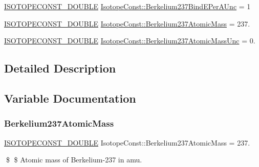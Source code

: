 \begin{DoxyCompactItemize}
\mbox{\hyperlink{group___isotope_const-_macros_ga8f45a7272ce02c0b4c65c44636ed719a}{I\+S\+O\+T\+O\+P\+E\+C\+O\+N\+S\+T\+\_\+\+D\+O\+U\+B\+LE}} \mbox{\hyperlink{group___isotope_const-_berkelium-_bk237_ga5ef39222d4a4b0b581ccd624ea06e32a}{Isotope\+Const\+::\+Berkelium237\+Bind\+E\+Per\+A\+Unc}} = 1
\item 
\mbox{\hyperlink{group___isotope_const-_macros_ga8f45a7272ce02c0b4c65c44636ed719a}{I\+S\+O\+T\+O\+P\+E\+C\+O\+N\+S\+T\+\_\+\+D\+O\+U\+B\+LE}} \mbox{\hyperlink{group___isotope_const-_berkelium-_bk237_gabf83e240309f0aab4899fb7a36ca5ffe}{Isotope\+Const\+::\+Berkelium237\+Atomic\+Mass}} = 237.
\item 
\mbox{\hyperlink{group___isotope_const-_macros_ga8f45a7272ce02c0b4c65c44636ed719a}{I\+S\+O\+T\+O\+P\+E\+C\+O\+N\+S\+T\+\_\+\+D\+O\+U\+B\+LE}} \mbox{\hyperlink{group___isotope_const-_berkelium-_bk237_ga8cd09a5243ab8bb2003865b2079b82f1}{Isotope\+Const\+::\+Berkelium237\+Atomic\+Mass\+Unc}} = 0.
\end{DoxyCompactItemize}


\subsection{Detailed Description}


\subsection{Variable Documentation}
\mbox{\label{group___isotope_const-_berkelium-_bk237_gabf83e240309f0aab4899fb7a36ca5ffe}} 
\subsubsection{\texorpdfstring{Berkelium237\+Atomic\+Mass}{Berkelium237AtomicMass}}
{\footnotesize\ttfamily \mbox{\hyperlink{group___isotope_const-_macros_ga8f45a7272ce02c0b4c65c44636ed719a}{I\+S\+O\+T\+O\+P\+E\+C\+O\+N\+S\+T\+\_\+\+D\+O\+U\+B\+LE}} Isotope\+Const\+::\+Berkelium237\+Atomic\+Mass = 237.}

\$ \$ Atomic mass of Berkelium-\/237 in amu. \mbox{\label{group___isotope_const-_berkelium-_bk237_ga8cd09a5243ab8bb2003865b2079b82f1}} 
